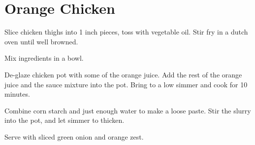 \section{Orange Chicken}
\begin{recipe}



Slice chicken thighs into 1 inch pieces, toss with vegetable oil. 
Stir fry in a dutch oven until well browned. 


Mix ingredients in a bowl. 


De-glaze chicken pot with some of the orange juice. 
Add the rest of the orange juice and the sauce mixture into the pot. 
Bring to a low simmer and cook for 10 minutes.


Combine corn starch and just enough water to make a loose paste. 
Stir the slurry into the pot, and let simmer to thicken. 


Serve with sliced green onion and orange zest. 

\end{recipe}
